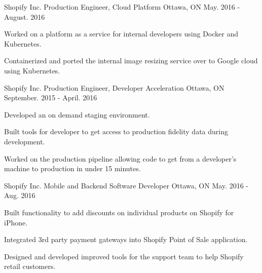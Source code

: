

\begin{cventries}

  \cventry
    {Shopify Inc.} %
    {Production Engineer, Cloud Platform} %
    {Ottawa, ON} %
    {May. 2016 - August. 2016} %
    {
      \begin{cvitems} %
        \item {Worked on a platform as a service for internal developers using Docker and Kubernetes.}
        \item {Containerized and ported the internal image resizing service over to Google cloud using Kubernetes.}
      \end{cvitems}
    }
    
  \cventry
    {Shopify Inc.} %
    {Production Engineer, Developer Acceleration} %
    {Ottawa, ON} %
    {September. 2015 - April. 2016} %
    {
      \begin{cvitems} %
        \item {Developed an on demand staging environment.}
        \item {Built tools for developer to get access to production fidelity data during development.}
        \item {Worked on the production pipeline allowing code to get from a developer's machine to production in under 15 minutes.}
      \end{cvitems}
    }

  \cventry
    {Shopify Inc.} %
    {Mobile and Backend Software Developer} %
    {Ottawa, ON} %
    {May. 2016 - Aug. 2016} %
    {
      \begin{cvitems} %
        \item {Built functionality to add discounts on individual products on Shopify for iPhone.}
        \item {Integrated 3rd party payment gateways into Shopify Point of Sale application.}
        \item {Designed and developed improved tools for the support team to help Shopify retail customers.}
      \end{cvitems}
    } 
    

\end{cventries}
